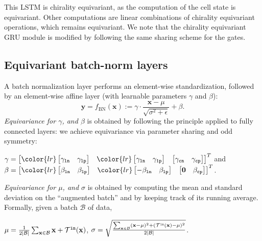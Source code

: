 \documentclass{article}
\def\rvx{{\mathbf{x}}}
\def\rvy{{\mathbf{y}}}
\begin{document}
This LSTM is chirality equivariant, as  the computation of the cell state is equivariant. Other computations are linear combinations of chirality equivariant operations, which remains equivariant. We note that the chirality equivariant GRU module  is modified by following the same sharing scheme for the gates.

\subsection{Equivariant batch-norm layers}
A batch normalization layer performs an element-wise standardization, followed by an element-wise affine layer (with learnable parameters $\gamma$ and $\beta$): 
$$
\rvy = f_{\text{BN}}(\rvx):= \gamma \cdot \frac{\rvx - \mu}{\sqrt{\sigma^2 + \epsilon}} + \beta.
$$
\textit{Equivariance for $\gamma$, and $\beta$} is obtained by 
following the  principle applied to fully connected layers: we achieve equivariance via parameter sharing and odd symmetry:
\begin{center}
$\gamma = 
\begin{bmatrix}
\color{lr}
\begin{bmatrix}
\gamma_{\tt ln} & \gamma_{\tt lp}
\end{bmatrix} &
\color{lr}
\begin{bmatrix}
\gamma_{\tt ln} & \gamma_{\tt 1p}
\end{bmatrix} &
\begin{bmatrix}
\gamma_{\tt cn} & \gamma_{\tt cp}
\end{bmatrix}
\end{bmatrix}^T$
and 
$\beta = \begin{bmatrix}
\color{lr}
\begin{bmatrix}
\beta_{\tt ln} & \beta_{\tt lp} 
\end{bmatrix}&
\color{lr}
\begin{bmatrix}-\beta_{\tt ln} & \beta_{\tt lp} 
\end{bmatrix}&
\begin{bmatrix}
\bf 0 & \beta_{\tt cp}
\end{bmatrix}\\
\end{bmatrix}^{T}$.
\end{center}

\textit{Equivariance for $\mu$, and $\sigma$} is obtained by
computing the mean and standard deviation on the ``augmented batch'' and by keeping track of its running average. Formally, given a batch $\mathcal{B}$ of data,
\begin{center}
$\mu = \frac{1}{2|\mathcal{B}|} \sum_{\rvx \in \mathcal{B}} \rvx + \mathcal{T}^{\tt in}(\rvx)$, \hspace{0.1cm} $\sigma =  \sqrt{\frac{\sum_{\rvx \in \mathcal{B}} (\rvx - \mu)^2 + (\mathcal{T}^{\tt in}(\rvx)- \mu)^2}{2 |\mathcal{B}|}}$.
\end{center}
\end{document}
